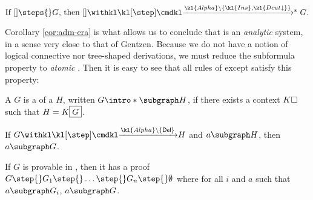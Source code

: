 \begin{scope}
\begin{corollary}\label{cor:adm-ins}
  $$
  \text{If $[] \steps{} G$, then $[]
  \xsteps{\kl{Alpha}\setminus\{\kl{Ins},\kl{Dcut{\da}}\}} G$.}
  $$
\end{corollary}

Corollary \ref{cor:adm-era} is what allows us to conclude that  is an
\emph{analytic} system, in a sense very close to that of Gentzen. Because we do
not have a notion of logical connective nor tree-shaped derivations, we must
reduce the subformula property to \emph{atomic} . Then it is easy to see
that all rules of  except  satisfy this property:

\begin{definition}[Subgraph]
  A  $G$ is a  of a  $H$, written $G \intro*\subgraph
  H$, if there exists a context $K\square$ such that $H = K\fbox{$G$}$.
\end{definition}

\begin{fact}
  If $G \xstep{\kl{Alpha} \setminus \{\mathsf{Del}\}} H$ and $a \subgraph H$,
  then $a \subgraph G$.
\end{fact}

\begin{corollary}[Analyticity]
  If $G$ is provable in , then it has a proof $G \step{} G_1 \step{}
  \ldots \step{} G_n \step{} \emptyset$ where for all $i$ and $a$ such that $a
  \subgraph G_i$, $a \subgraph G$.
\end{corollary}



\end{scope}


